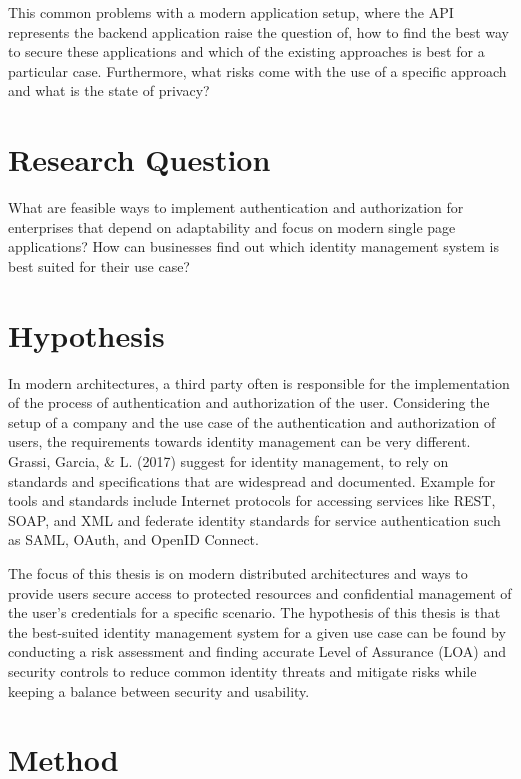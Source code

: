 This common problems with a modern application setup, where the API represents the backend application raise the question of, how to find the best way to secure these applications and which of the existing approaches is best for a particular case. Furthermore, what risks come with the use of a specific approach and what is the state of privacy? 


\section{Research Question}

What are feasible ways to implement authentication and authorization for enterprises that depend on adaptability and focus on modern single page applications? How can businesses find out which identity management system is best suited for their use case? 

\section{Hypothesis}

In modern architectures, a third party often is responsible for the implementation of the process of authentication and authorization of the user. Considering the setup of a company and the use case of the authentication and authorization of users, the requirements towards identity management can be very different. Grassi, Garcia, \& L. (2017) suggest for identity management, to rely on standards and specifications that are widespread and documented. Example for tools and standards include Internet protocols for accessing services like REST, SOAP, and XML and federate identity standards for service authentication such as SAML, OAuth, and OpenID Connect.

The focus of this thesis is on modern distributed architectures and ways to provide users secure access to protected resources and confidential management of the user’s credentials for a specific scenario. The hypothesis of this thesis is that the best-suited identity management system for a given use case can be found by conducting a risk assessment and finding accurate Level of Assurance (LOA) and security controls to reduce common identity threats and mitigate risks while keeping a balance between security and usability.

\section{Method}

